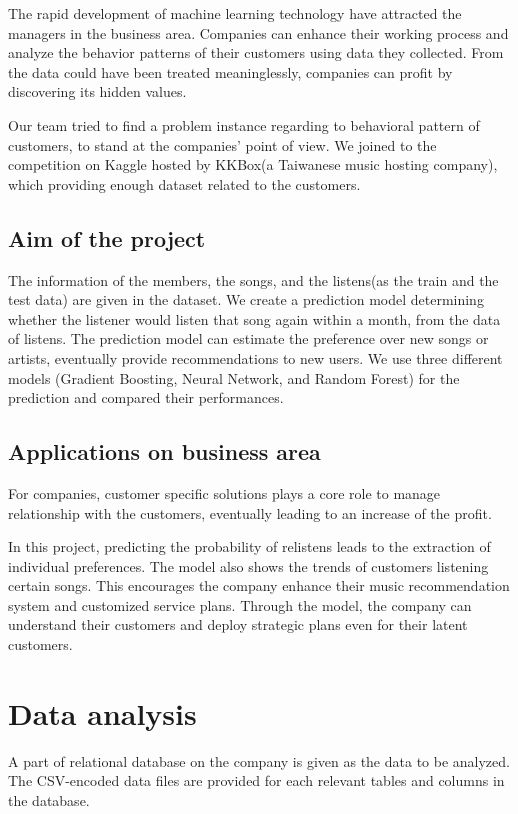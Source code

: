 \documentclass{article}
\begin{document}
The rapid development of machine learning technology have attracted the managers
in the business area. Companies can enhance their working process and analyze
the behavior patterns of their customers using data they collected. From the
data could have been treated meaninglessly, companies can profit by discovering
its hidden values.

Our team tried to find a problem instance regarding to behavioral pattern of
customers, to stand at the companies' point of view. We joined to the
competition on Kaggle hosted by KKBox(a Taiwanese music hosting company), which
providing enough dataset related to the customers.

\subsection{Aim of the project}
The information of the members, the songs, and the listens(as the train and
the test data) are given in the dataset. We create a prediction
model determining whether the listener would listen that song again within a
month, from the data of listens. The prediction model can estimate the
preference over new songs or artists, eventually provide recommendations to new
users. We use three different models (Gradient Boosting, Neural Network, and
Random Forest) for the prediction and compared their performances.

\subsection{Applications on business area}
For companies, customer specific solutions plays a core role to manage
relationship with the customers, eventually leading to an increase of the
profit.

In this project, predicting the probability of relistens leads to the
extraction of individual preferences. The model also shows the trends of customers listening certain
songs. This encourages the company enhance their music recommendation system
and customized service plans. Through the model, the company can understand
their customers and deploy strategic plans even for their latent customers.
\newpage
\section{Data analysis}
A part of relational database on the company is given as the data to be
analyzed. The CSV-encoded data files are provided for each relevant tables and
columns in the database.
\end{document}
